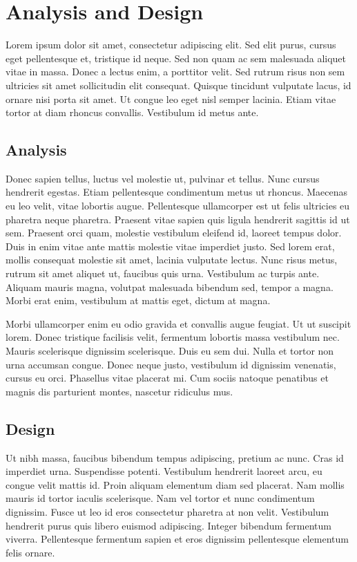 \chapter{Analysis and Design}
\label{chap:analysis}

Lorem ipsum dolor sit amet, consectetur adipiscing elit. Sed elit purus, cursus eget pellentesque et, tristique id neque. Sed non quam ac sem malesuada aliquet vitae in massa. Donec a lectus enim, a porttitor velit. Sed rutrum risus non sem ultricies sit amet sollicitudin elit consequat. Quisque tincidunt vulputate lacus, id ornare nisi porta sit amet. Ut congue leo eget nisl semper lacinia. Etiam vitae tortor at diam rhoncus convallis. Vestibulum id metus ante.

\section{Analysis}

Donec sapien tellus, luctus vel molestie ut, pulvinar et tellus. Nunc cursus hendrerit egestas. Etiam pellentesque condimentum metus ut rhoncus. Maecenas eu leo velit, vitae lobortis augue. Pellentesque ullamcorper est ut felis ultricies eu pharetra neque pharetra. Praesent vitae sapien quis ligula hendrerit sagittis id ut sem. Praesent orci quam, molestie vestibulum eleifend id, laoreet tempus dolor. Duis in enim vitae ante mattis molestie vitae imperdiet justo. Sed lorem erat, mollis consequat molestie sit amet, lacinia vulputate lectus. Nunc risus metus, rutrum sit amet aliquet ut, faucibus quis urna. Vestibulum ac turpis ante. Aliquam mauris magna, volutpat malesuada bibendum sed, tempor a magna. Morbi erat enim, vestibulum at mattis eget, dictum at magna.

Morbi ullamcorper enim eu odio gravida et convallis augue feugiat. Ut ut suscipit lorem. Donec tristique facilisis velit, fermentum lobortis massa vestibulum nec. Mauris scelerisque dignissim scelerisque. Duis eu sem dui. Nulla et tortor non urna accumsan congue. Donec neque justo, vestibulum id dignissim venenatis, cursus eu orci. Phasellus vitae placerat mi. Cum sociis natoque penatibus et magnis dis parturient montes, nascetur ridiculus mus.

\section{Design}
Ut nibh massa, faucibus bibendum tempus adipiscing, pretium ac nunc. Cras id imperdiet urna. Suspendisse potenti. Vestibulum hendrerit laoreet arcu, eu congue velit mattis id. Proin aliquam elementum diam sed placerat. Nam mollis mauris id tortor iaculis scelerisque. Nam vel tortor et nunc condimentum dignissim. Fusce ut leo id eros consectetur pharetra at non velit. Vestibulum hendrerit purus quis libero euismod adipiscing. Integer bibendum fermentum viverra. Pellentesque fermentum sapien et eros dignissim pellentesque elementum felis ornare.

